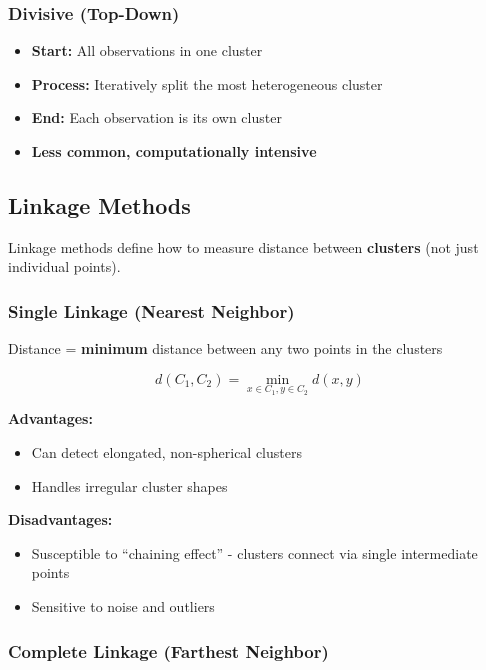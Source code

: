 \documentclass[
]{article}
\begin{document}
\subsubsection{Divisive (Top-Down)}

\begin{itemize}
\item
  \textbf{Start:} All observations in one cluster
\item
  \textbf{Process:} Iteratively split the most heterogeneous cluster
\item
  \textbf{End:} Each observation is its own cluster
\item
  \textbf{Less common, computationally intensive}
\end{itemize}

\textbf{ }

\subsection{Linkage Methods}

Linkage methods define how to measure distance between \textbf{clusters}
(not just individual points).

\subsubsection{Single Linkage (Nearest Neighbor)}

Distance = \textbf{minimum} distance between any two points in the
clusters

\[d\left( C_{1},C_{2} \right) = \min\limits_{x \in C_{1},y \in C_{2}}d(x,y)\]

\textbf{Advantages:}

\begin{itemize}
\item
  Can detect elongated, non-spherical clusters
\item
  Handles irregular cluster shapes
\end{itemize}

\textbf{Disadvantages:}

\begin{itemize}
\item
  Susceptible to ``chaining effect'' - clusters connect via single
  intermediate points
\item
  Sensitive to noise and outliers
\end{itemize}

\subsubsection{Complete Linkage (Farthest Neighbor)}
\end{document}
